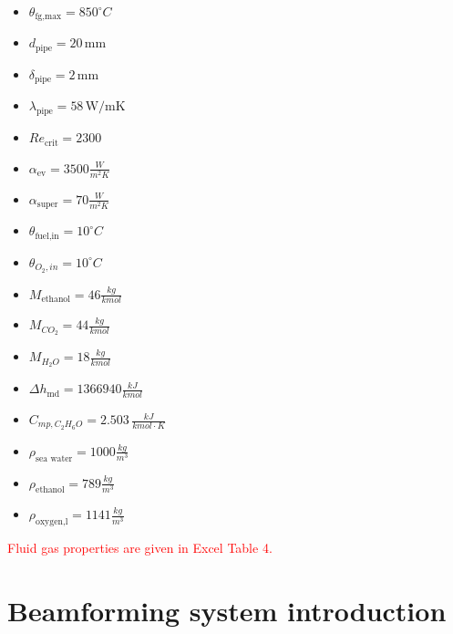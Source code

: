 \documentclass{article}
\begin{document}
	\begin{itemize}
		\item $\theta_\textrm{fg,max} = 850 ^\circ C$
		\item $d_\textrm{pipe} = 20 \,\textrm{mm}$
		\item $\delta_\textrm{pipe} = 2 \,\textrm{mm}$
		\item $\lambda_\textrm{pipe}  = 58 \,\textrm{W/mK}$
		\item $Re_\textrm{crit} = 2300$
		\item $\alpha_\textrm{ev} = 3500 \frac{W}{m^2K}$
		\item $\alpha_\textrm{super} = 70 \frac{W}{m^2K}$
		\item $\theta_\textrm{fuel,in} = 10 ^\circ C$
		\item $\theta_{O_2,in} = 10 ^\circ C$
		\item $M_\textrm{ethanol} = 46 \frac{kg}{kmol}$
		\item $M_{CO_2} = 44 \frac{kg}{kmol}$
		\item $M_{H_2O} = 18 \frac{kg}{kmol}$
		\item $\Delta h_\textrm{md} = 1366940 \frac{kJ}{kmol}$
		\item $C_{mp,C_2H_6O} = 2.503 \,\frac{kJ}{kmol \cdot K}$
		\item $\rho_\textrm{sea\ water} = 1000 \frac{kg}{m^3}$
		\item $\rho_\textrm{ethanol} = 789 \frac{kg}{m^3}$
		\item $\rho_\textrm{oxygen,l} = 1141 \frac{kg}{m^3}$
	\end{itemize}

	\noindent
	\textcolor{red}{Fluid gas properties are given in Excel Table 4.}

\clearpage

\section{Beamforming system introduction}
\end{document}
